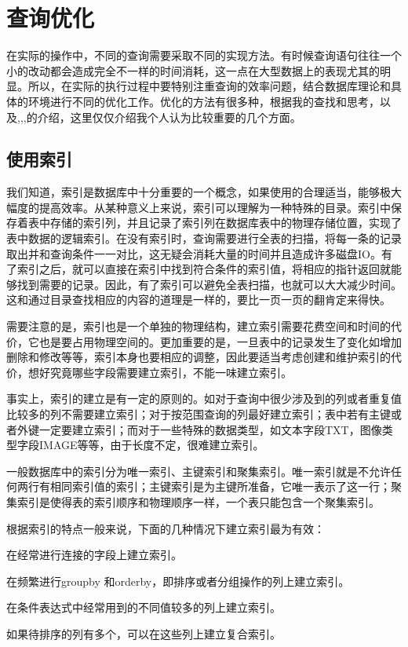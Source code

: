 \chapter{查询优化}
在实际的操作中，不同的查询需要采取不同的实现方法。有时候查询语句往往一个小的改动都会造成完全不一样的时间消耗，这一点在大型数据上的表现尤其的明显。所以，在实际的执行过程中要特别注重查询的效率问题，结合数据库理论和具体的环境进行不同的优化工作。优化的方法有很多种，根据我的查找和思考，以及\cite{youhua},\cite{youhuayanjiu},\cite{hiveperformemce},\cite{youhuaqi}的介绍，这里仅仅介绍我个人认为比较重要的几个方面。

\section{使用索引}
我们知道，索引是数据库中十分重要的一个概念，如果使用的合理适当，能够极大幅度的提高效率。从某种意义上来说，索引可以理解为一种特殊的目录。索引中保存着表中存储的索引列，并且记录了索引列在数据库表中的物理存储位置，实现了表中数据的逻辑索引。在没有索引时，查询需要进行全表的扫描，将每一条的记录取出并和查询条件一一对比，这无疑会消耗大量的时间并且造成许多磁盘IO。有了索引之后，就可以直接在索引中找到符合条件的索引值，将相应的指针返回就能够找到需要的记录。因此，有了索引可以避免全表扫描，也就可以大大减少时间。这和通过目录查找相应的内容的道理是一样的，要比一页一页的翻肯定来得快。


需要注意的是，索引也是一个单独的物理结构，建立索引需要花费空间和时间的代价，它也是要占用物理空间的。更加重要的是，一旦表中的记录发生了变化如增加删除和修改等等，索引本身也要相应的调整，因此要适当考虑创建和维护索引的代价，想好究竟哪些字段需要建立索引，不能一味建立索引。


事实上，索引的建立是有一定的原则的。如对于查询中很少涉及到的列或者重复值比较多的列不需要建立索引；对于按范围查询的列最好建立索引；表中若有主键或者外键一定要建立索引；而对于一些特殊的数据类型，如文本字段TXT，图像类型字段IMAGE等等，由于长度不定，很难建立索引。


一般数据库中的索引分为唯一索引、主键索引和聚集索引。唯一索引就是不允许任何两行有相同索引值的索引；主键索引是为主键所准备，它唯一表示了这一行；聚集索引是使得表的索引顺序和物理顺序一样，一个表只能包含一个聚集索引。


根据索引的特点一般来说，下面的几种情况下建立索引最为有效：
\begin{compactitem}
\item
在经常进行连接的字段上建立索引。
\item
在频繁进行groupby 和orderby，即排序或者分组操作的列上建立索引。
\item
在条件表达式中经常用到的不同值较多的列上建立索引。
\item
如果待排序的列有多个，可以在这些列上建立复合索引。
\end{compactitem}

